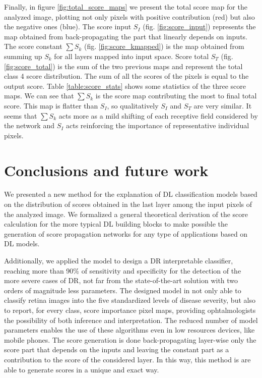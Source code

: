 \documentclass[review]{elsarticle}
\theoremstyle{definition} %
\theoremstyle{remark}
\begin{document}
Finally, in figure \ref{fig:total_score_maps} we present the total score map for the analyzed image, plotting not only pixels with positive contribution (red) but also the negative ones (blue). The score input $S_I$ (fig. \ref{fig:score_input}) represents the map obtained from back-propagating the part that linearly depends on inputs. The score constant $\sum S_k$ (fig. \ref{fig:score_kmapped}) is the map obtained from summing up $S_k$ for all layers mapped into input space. Score total $S_T$ (fig. \ref{fig:score_total}) is the sum of the two previous maps and represent the total class 4 score distribution. The sum of all the scores of the pixels is equal to the output score. Table \ref{table:score_stats} shows some statistics of the three score maps. We can see that $\sum S_k$ is the score map contributing the most to final total score. This map is flatter than $S_I$, so qualitatively $S_I$ and $S_T$ are very similar. It seems that $\sum S_k$ acts more as a mild shifting of each receptive field considered by the network and $S_I$ acts reinforcing the importance of representative individual pixels.


\section{Conclusions and future work}\label{sec:conclusions}

We presented a new method for the explanation of DL classification models based on the distribution of scores obtained in the last layer among the input pixels of the analyzed image. We formalized a general theoretical derivation of the score calculation for the more typical DL building blocks to make possible the generation of score propagation networks for any type of applications based on DL models.  

Additionally, we applied the model to design a DR interpretable classifier, reaching more than 90\% of sensitivity and specificity for the detection of the more severe cases of DR, not far from the state-of-the-art solution with two orders of magnitude less parameters. The designed model in not only able to classify retina images into the five standardized levels of disease severity, but also to report, for every class, score importance pixel maps, providing ophtalmologists the possibility of both inference and interpretation. The reduced number of model parameters enables the use of these algorithms even in low resources devices, like mobile phones. The score generation is done back-propagating layer-wise only the score part that depends on the inputs and leaving the constant part as a contribution to the score of the considered layer. In this way, this method is are able to generate scores in a unique and exact way. 
\end{document}
